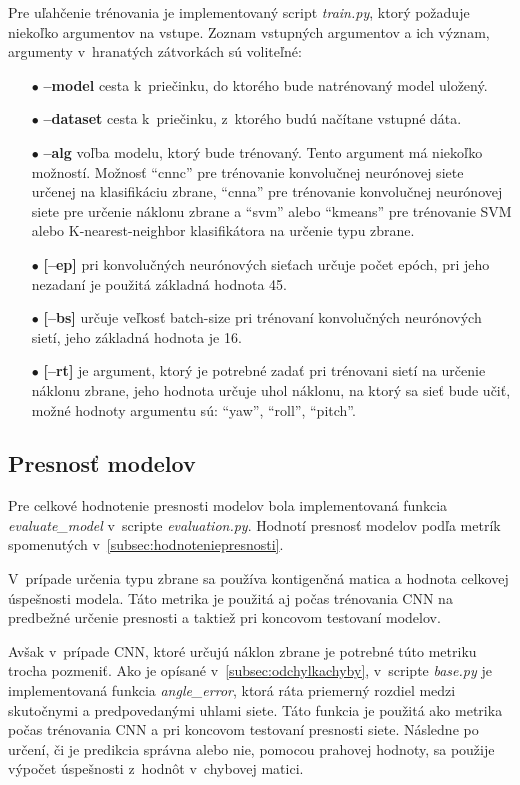 Pre uľahčenie trénovania je implementovaný script \textit{train.py}, ktorý požaduje niekoľko argumentov na vstupe.
Zoznam vstupných argumentov a ich význam, argumenty v~hranatých zátvorkách sú voliteľné:
\begin{enumerate}
    \item[$\bullet$] \textbf{--model} cesta k~priečinku, do ktorého bude natrénovaný model uložený.
    \item[$\bullet$] \textbf{--dataset} cesta k~priečinku, z~ktorého budú načítane vstupné dáta.
    \item[$\bullet$] \textbf{--alg} voľba modelu, ktorý bude trénovaný. Tento argument má niekoľko možností.
    Možnosť ``cnnc'' pre trénovanie konvolučnej neurónovej siete určenej na klasifikáciu zbrane,
    ``cnna'' pre trénovanie konvolučnej neurónovej siete pre určenie náklonu zbrane a
    ``svm'' alebo ``kmeans'' pre trénovanie SVM alebo K-nearest-neighbor klasifikátora na určenie typu zbrane.
    \item[$\bullet$] \textbf{[--ep]} pri konvolučných neurónových sieťach určuje počet epóch, pri jeho nezadaní je použitá
    základná hodnota 45.
    \item[$\bullet$] \textbf{[--bs]} určuje veľkosť batch-size pri trénovaní konvolučných neurónových sietí, jeho
    základná hodnota je 16.
    \item[$\bullet$] \textbf{[--rt]} je argument, ktorý je potrebné zadať pri trénovani sietí na určenie náklonu zbrane,
    jeho hodnota určuje uhol náklonu, na ktorý sa sieť bude učiť, možné hodnoty argumentu sú: ``yaw'', ``roll'', ``pitch''.
\end{enumerate}

\subsection{Presnosť modelov}
\label{subsec:presnostmodelov}
Pre celkové hodnotenie presnosti modelov bola implementovaná funkcia \textit{evaluate\_model} v~scripte \textit{evaluation.py}.
Hodnotí presnosť modelov podľa metrík spomenutých v~\ref{subsec:hodnoteniepresnosti}.

V~prípade určenia typu zbrane sa používa kontigenčná matica a hodnota celkovej úspešnosti modela.
Táto metrika je použitá aj počas trénovania CNN na predbežné určenie presnosti a taktiež pri koncovom testovaní modelov.

Avšak v~prípade CNN, ktoré určujú náklon zbrane je potrebné túto metriku trocha pozmeniť.
Ako je opísané v~\ref{subsec:odchylkachyby}, v~scripte \textit{base.py} je implementovaná funkcia \textit{angle\_error}, ktorá ráta priemerný rozdiel medzi
    skutočnymi a predpovedanými uhlami siete.
Táto funkcia je použitá ako metrika počas trénovania CNN a pri koncovom testovaní presnosti siete.
Následne po určení, či je predikcia správna alebo nie, pomocou prahovej hodnoty, sa použije výpočet úspešnosti z~hodnôt v~chybovej matici.
